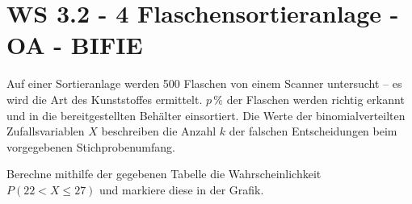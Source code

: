 \section{WS 3.2 - 4 Flaschensortieranlage - OA - BIFIE}

\begin{beispiel}[WS 3.2]{1} %
Auf einer Sortieranlage werden 500 Flaschen von einem Scanner untersucht -- es wird die Art
des Kunststoffes ermittelt. $p\,\%$ der Flaschen werden richtig erkannt und in die bereitgestellten Behälter einsortiert. Die Werte der binomialverteilten Zufallsvariablen $X$ beschreiben die Anzahl $k$ der falschen Entscheidungen beim vorgegebenen Stichprobenumfang. \leer

 Berechne  mithilfe der gegebenen Tabelle die Wahrscheinlichkeit $P(22 < X \leq 27)$ und markiere diese in der Grafik. 
\leer


\end{beispiel}
